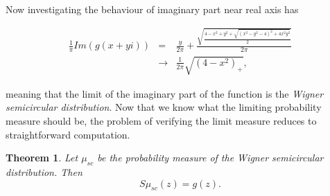 \documentclass[12pt,a4paper,leqno]{report}
\theoremstyle{plain}
\newtheorem{theo}[equation]{Theorem}
\theoremstyle{definition}
\theoremstyle{remark}
\begin{document}
Now investigating the behaviour of imaginary part near real axis has

\begin{eqnarray*}
\frac{1}{\pi} Im(g(x+yi)) & = &
\frac{y}{2\pi} + \frac{\sqrt{\frac{4-x^2+y^2+\sqrt{(x^2-y^2-4)^2+4x^2y^2}}{2}}}{2\pi}\\
& \to & \frac{1}{2\pi} \sqrt{(4-x^2)_+},
\end{eqnarray*}

meaning that the limit of the imaginary part of the function is the \emph{Wigner semicircular distribution}. Now that we know what the limiting probability measure should be, the problem of verifying the limit measure reduces to straightforward computation.

\begin{theo}
Let $\mu_{sc}$ be the probability measure of the Wigner semicircular distribution. Then
\begin{equation*}
S\mu_{sc}(z) = g(z).
\end{equation*}
\end{theo}
\end{document}
